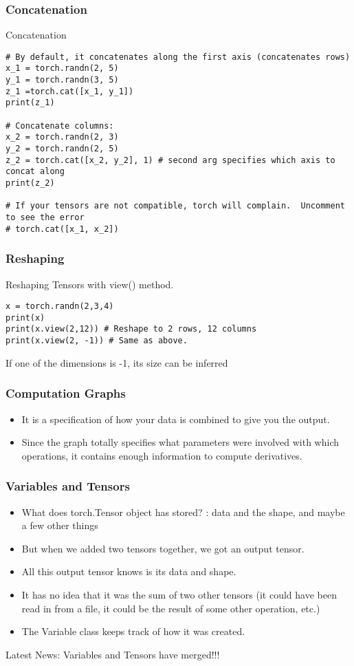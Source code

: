 \begin{frame}[fragile]
\frametitle{Concatenation}
Concatenation
 \begin{lstlisting}
# By default, it concatenates along the first axis (concatenates rows)
x_1 = torch.randn(2, 5)
y_1 = torch.randn(3, 5)
z_1 =torch.cat([x_1, y_1])
print(z_1)

# Concatenate columns:
x_2 = torch.randn(2, 3)
y_2 = torch.randn(2, 5)
z_2 = torch.cat([x_2, y_2], 1) # second arg specifies which axis to concat along
print(z_2)

# If your tensors are not compatible, torch will complain.  Uncomment to see the error
# torch.cat([x_1, x_2])
 \end{lstlisting}
 \end{frame} 
 
\begin{frame}[fragile]
\frametitle{Reshaping}
Reshaping Tensors with view() method.
 \begin{lstlisting}
x = torch.randn(2,3,4)
print(x)
print(x.view(2,12)) # Reshape to 2 rows, 12 columns
print(x.view(2, -1)) # Same as above. 
 \end{lstlisting}
  If one of the dimensions is -1, its size can be inferred
 \end{frame} 
 
\begin{frame}[fragile]
\frametitle{Computation Graphs}

\begin{itemize}
\item It is a specification of how your data is combined to give you the output. 
\item Since the graph totally specifies what parameters were involved with which operations, it contains enough information to compute derivatives.
\end{itemize}
 \end{frame} 
 
 
\begin{frame}[fragile]
\frametitle{Variables and Tensors}
\begin{itemize}
\item What does torch.Tensor object has stored? : data and the shape, and maybe a few other things
\item But when we added two tensors together, we got an output tensor. 
\item All this output tensor knows is its data and shape. 
\item It has no idea that it was the sum of two other tensors (it could have been read in from a file, it could be the result of some other operation, etc.)
\item The Variable class keeps track of how it was created. 
\end{itemize}
Latest News: Variables and Tensors have merged!!!
 \end{frame} 
 
